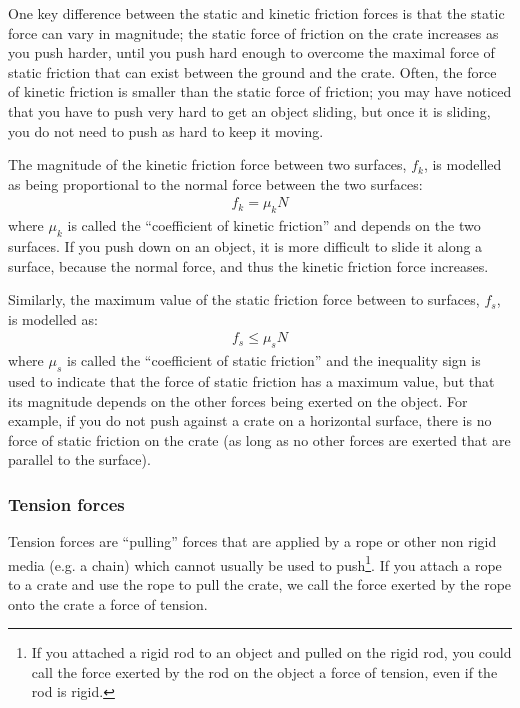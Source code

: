 One key difference between the static and kinetic friction forces is that the static force can vary in magnitude; the static force of friction on the crate increases as you push harder, until you push hard enough to overcome the maximal force of static friction that can exist between the ground and the crate. Often, the force of kinetic friction is smaller than the static force of friction; you may have noticed that you have to push very hard to get an object sliding, but once it is sliding, you do not need to push as hard to keep it moving.

The magnitude of the kinetic friction force between two surfaces, $f_k$, is modelled as being proportional to the normal force between the two surfaces:
\begin{align*}
f_k=\mu_kN
\end{align*}
where $\mu_k$ is called the ``coefficient of kinetic friction'' and depends on the two surfaces. If you push down on an object, it is more difficult to slide it along a surface, because the normal force, and thus the kinetic friction force increases.

Similarly, the maximum value of the static friction force between to surfaces, $f_s$, is modelled as:
\begin{align*}
f_s\leq\mu_sN
\end{align*}
where $\mu_s$ is called the ``coefficient of static friction'' and the inequality sign is used to indicate that the force of static friction has a maximum value, but that its magnitude depends on the other forces being exerted on the object. For example, if you do not push against a crate on a horizontal surface, there is no force of static friction on the crate (as long as no other forces are exerted that are parallel to the surface).


\subsubsection{Tension forces}
Tension forces are ``pulling'' forces that are applied by a rope or other non rigid media (e.g. a chain) which cannot usually be used to push\footnote{If you attached a rigid rod to an object and pulled on the rigid rod, you could call the force exerted by the rod on the object a force of tension, even if the rod is rigid.}. If you attach a rope to a crate and use the rope to pull the crate, we call the force exerted by the rope onto the crate a force of tension.

